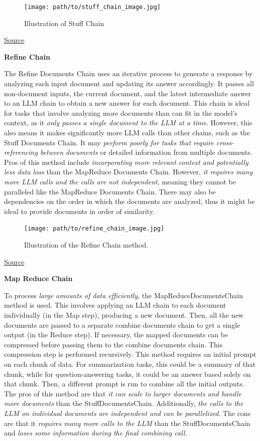 \documentclass{scrartcl}
\begin{document}
\begin{figure}[H]
    \centering
    \texttt{[image: path/to/stuff\_chain\_image.jpg]}
    \caption{Illustration of Stuff Chain}
\end{figure}
\href{https://readmedium.com/en/https:/ogre51.medium.com/types-of-chains-in-langchain-823c8878c2e9}{Source}

\textbf{Refine Chain}

The Refine Documents Chain uses an iterative process to generate a response by analyzing each input document and updating its answer accordingly.
It passes all non-document inputs, the current document, and the latest intermediate answer to an LLM chain to obtain a new answer for each document.
This chain is ideal for tasks that involve analyzing more documents than can fit in the model’s context, as it \textit{only passes a single document to the LLM at a time}.
However, this also means it makes significantly more LLM calls than other chains, such as the Stuff Documents Chain. It may \textit{perform poorly for tasks that require cross-referencing between documents} or detailed information from multiple documents.
Pros of this method include \textit{incorporating more relevant context and potentially less data loss} than the MapReduce Documents Chain. However, \textit{it requires many more LLM calls and the calls are not independent}, meaning they cannot be paralleled like the MapReduce Documents Chain.
There may also be dependencies on the order in which the documents are analyzed, thus it might be ideal to provide documents in order of similarity.

\begin{figure}[H]
    \centering
    \texttt{[image: path/to/refine\_chain\_image.jpg]}
    \caption{Illustration of the Refine Chain method.}
\end{figure}
\href{https://readmedium.com/en/https:/ogre51.medium.com/types-of-chains-in-langchain-823c8878c2e9}{Source}

\textbf{Map Reduce Chain}

To process \textit{large amounts of data efficiently}, the MapReduceDocumentsChain method is used.
This involves applying an LLM chain to each document individually (in the Map step), producing a new document. Then, all the new documents are passed to a separate combine documents chain to get a single output (in the Reduce step). If necessary, the mapped documents can be compressed before passing them to the combine documents chain.
This compression step is performed recursively.
This method requires an initial prompt on each chunk of data.
For summarization tasks, this could be a summary of that chunk, while for question-answering tasks, it could be an answer based solely on that chunk. Then, a different prompt is run to combine all the initial outputs.
The pros of this method are that \textit{it can scale to larger documents and handle more documents} than the StuffDocumentsChain. Additionally, \textit{the calls to the LLM on individual documents are independent and can be parallelized}.
The cons are that it \textit{requires many more calls to the LLM} than the StuffDocumentsChain and \textit{loses some information during the final combining call}.
\end{document}
